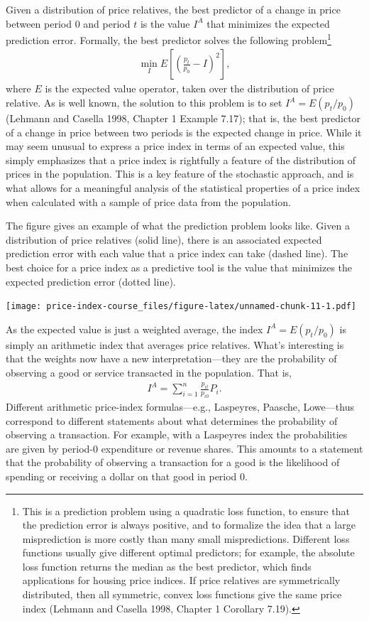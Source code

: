 \documentclass[]{article}
\begin{document}
Given a distribution of price relatives, the best predictor of a change in price between period 0 and period \(t\) is the value \(I^{A}\) that minimizes the expected prediction error. Formally, the best predictor solves the following problem\footnote{This is a prediction problem using a quadratic loss function, to ensure that the prediction error is always positive, and to formalize the idea that a large misprediction is more costly than many small mispredictions. Different loss functions usually give different optimal predictors; for example, the absolute loss function returns the median as the best predictor, which finds applications for housing price indices. If price relatives are symmetrically distributed, then all symmetric, convex loss functions give the same price index (Lehmann and Casella 1998, Chapter 1 Corollary 7.19).}
\begin{align*}
\min_{I} E\left[\left(\frac{p_{t}}{p_{0}} - I \right)^{2}\right],
\end{align*}
where \(E\) is the expected value operator, taken over the distribution of price relative. As is well known, the solution to this problem is to set \(I^{A} = E(p_{t} / p_{0})\) (Lehmann and Casella 1998, Chapter 1 Example 7.17); that is, the best predictor of a change in price between two periods is the expected change in price. While it may seem unusual to express a price index in terms of an expected value, this simply emphasizes that a price index is rightfully a feature of the distribution of prices in the population. This is a key feature of the stochastic approach, and is what allows for a meaningful analysis of the statistical properties of a price index when calculated with a sample of price data from the population.

The figure gives an example of what the prediction problem looks like. Given a distribution of price relatives (solid line), there is an associated expected prediction error with each value that a price index can take (dashed line). The best choice for a price index as a predictive tool is the value that minimizes the expected prediction error (dotted line).

\texttt{[image: price-index-course\_files/figure-latex/unnamed-chunk-11-1.pdf]}

As the expected value is just a weighted average, the index \(I^{A} = E(p_{t} / p_{0})\) is simply an arithmetic index that averages price relatives. What's interesting is that the weights now have a new interpretation---they are the probability of observing a good or service transacted in the population. That is,
\begin{align*}
I^{A} = \sum_{i = 1}^{n} \frac{p_{it}}{p_{i0}} P_{i}.
\end{align*}
Different arithmetic price-index formulas---e.g., Laspeyres, Paasche, Lowe---thus correspond to different statements about what determines the probability of observing a transaction. For example, with a Laspeyres index the probabilities are given by period-0 expenditure or revenue shares. This amounts to a statement that the probability of observing a transaction for a good is the likelihood of spending or receiving a dollar on that good in period 0.
\end{document}
